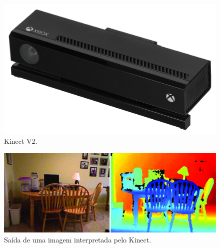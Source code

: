 \documentclass[table, usenames, svgnames, xcolor=dvipsnames]{beamer}
\begin{document}
\begin{frame}
	\begin{figure}
		\centering
		\includegraphics[width=0.5\linewidth]{figs/Xbox-One-Kinect.jpg}
		\caption{%
 		 Kinect V2.
		}
	\end{figure}
\end{frame}

\begin{frame}
	\begin{figure}
		\centering
		\includegraphics[width=1\linewidth]{figs/profundidadekinect.png}
		\caption{%
 			 Saída de uma imagem interpretada pelo Kinect.
		}
	\end{figure}
\end{frame}
\end{document}
